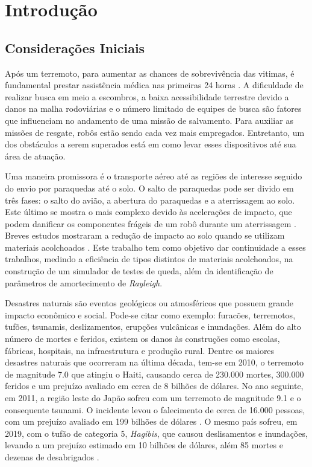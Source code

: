 \chapter{Introdução}\label{cap:introducao}

\section{Considerações Iniciais}
Após um terremoto, para aumentar as chances de sobrevivência das vitimas,
é fundamental prestar assistência médica nas primeiras 24 horas \cite{schultz1996medical}.
A dificuldade de realizar busca em meio a escombros, a baixa acessibilidade terrestre devido a danos na malha rodoviárias e o número limitado de equipes de busca são fatores que influenciam no andamento de uma missão de salvamento.
Para auxiliar as missões de resgate, robôs estão sendo cada vez mais empregados. Entretanto, um dos obstáculos a serem superados está em como levar esses dispositivos até sua área de atuação. 

Uma maneira promissora é o transporte aéreo até as regiões de interesse seguido do envio por paraquedas até o solo. 
O salto de paraquedas pode ser divido em três fases: o salto do avião, a abertura do paraquedas e a aterrissagem ao solo.
Este último se mostra o mais complexo devido às acelerações de impacto, que podem danificar os componentes frágeis de um robô durante um aterrissagem \cite{tsujita2017drop}.
Breves estudos mostraram a redução de impacto ao solo quando se utilizam materiais acolchoados \cite{tsujita2017drop} \cite{tsujita2017analysis}.
Este trabalho tem como objetivo dar continuidade a esses trabalhos, medindo a eficiência de tipos distintos de materiais acolchoados, na construção de um simulador de testes de queda, além da identificação de parâmetros de amortecimento de \textit{Rayleigh}.

Desastres naturais são eventos geológicos ou atmosféricos que possuem grande impacto econômico e social. Pode-se citar como exemplo: furacões, terremotos, tufões, tsunamis, deslizamentos, erupções vulcânicas e inundações\cite{naturaldisasters}.
Além do alto número de mortes e feridos, existem os danos às construções como escolas, fábricas, hospitais, na infraestrutura e produção rural\cite{benson1997economic}.
Dentre os maiores desastres naturais que ocorreram na última década, tem-se em 2010, o terremoto de magnitude 7.0 que atingiu o Haiti, causando cerca de 230.000 mortes, 300.000 feridos e um prejuízo avaliado em cerca de 8 bilhões de dólares\cite{haiti2010}.
No ano seguinte, em 2011, a região leste do Japão sofreu com um terremoto de magnitude 9.1 e o consequente tsunami. O incidente levou o falecimento de cerca de 16.000 pessoas, com um prejuízo avaliado em 199 bilhões de dólares \cite{tohoku2011}.
O mesmo país sofreu, em 2019, com o tufão de categoria 5, \textit{Hagibis}, que causou deslisamentos e inundações, levando a um prejuízo estimado em 10 bilhões de dólares, além 85 mortes e dezenas de desabrigados \cite{hagibis2019}.


